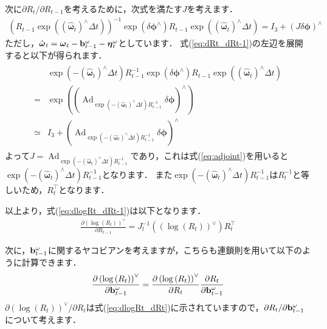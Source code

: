 次に$\partial R_{t} / \partial R_{t-1}$を考えるために，次式を満たす$J$を考えます．
%
\begin{align}
  \left( R_{t-1} \exp \left( \left( \hat{ \boldsymbol \omega }_{t} \right)^{\wedge} \Delta t \right) \right)^{-1} \exp \left( \delta \boldsymbol \phi^{\wedge} \right) R_{t-1} \exp \left( \left( \hat{ \boldsymbol \omega }_{t} \right)^{\wedge} \Delta t \right)
  =
  I_{3} + \left( J \delta \boldsymbol \phi \right)^{\wedge}
  \label{eq:dRt_dRt-1}
\end{align}
%
ただし，$\hat{ \boldsymbol \omega }_{t} = \boldsymbol \omega_{t} - {\bf b}_{t-1}^{\omega} - \boldsymbol \eta_{t}^{\omega}$としています．
式(\ref{eq:dRt_dRt-1})の左辺を展開すると以下が得られます．
%
\begin{align}
  \begin{split}
    & \exp \left( -\left( \hat{ \boldsymbol \omega }_{t} \right)^{\wedge} \Delta t \right) R_{t-1}^{-1} \exp \left( \delta \boldsymbol \phi^{\wedge} \right) R_{t-1} \exp \left( \left( \hat{ \boldsymbol \omega }_{t} \right)^{\wedge} \Delta t \right) \\
    = &
    \exp \left( \left( \operatorname{Ad}_{ \exp \left( -\left( \hat{ \boldsymbol \omega }_{t} \right)^{\wedge} \Delta t \right) R_{t-1}^{-1} } \delta \boldsymbol \phi \right)^{\wedge} \right) \\
    \simeq & I_{3} + \left( \operatorname{Ad}_{ \exp \left( -\left( \hat{ \boldsymbol \omega }_{t} \right)^{\wedge} \Delta t \right) R_{t-1}^{-1} } \delta \boldsymbol \phi \right)^{\wedge}
  \end{split}
\end{align}
%
よって$J = \operatorname{Ad}_{ \exp \left( -\left( \hat{ \boldsymbol \omega }_{t} \right)^{\wedge} \Delta t \right) R_{t-1}^{-1} }$であり，これは式(\ref{eq:adjoint})を用いると$\exp \left( -\left( \hat{ \boldsymbol{\omega} }_{t} \right)^{\wedge} \Delta t \right) R_{t-1}^{-1}$となります．
また$\exp \left( -\left( \hat{ \boldsymbol{\omega} }_{t} \right)^{\wedge} \Delta t \right) R_{t-1}^{-1}$は$R_{t}^{-1}$と等しいため，$R_{t}^{\top}$となります．

以上より，式(\ref{eq:dlogRt_dRt-1})は以下となります．
%
\begin{align}
  \frac{ \partial \left( \log \left( R_{t} \right) \right)^{\vee} }{ \partial R_{t-1} }
  =
  J_{l}^{-1} \left( \left( \log \left( R_{t} \right) \right)^{\vee} \right) R_{t}^{\top}
\end{align}
%

次に，${\bf b}_{t-1}^{\omega}$に関するヤコビアンを考えますが，こちらも連鎖則を用いて以下のように計算できます．
%
\begin{align}
  \frac{ \partial \left( \log \left( R_{t} \right) \right)^{\vee} }{ \partial {\bf b}_{t-1}^{\omega} }
  =
  \frac{ \partial \left( \log \left( R_{t} \right) \right)^{\vee} }{ \partial R_{t} }
  \frac{ \partial R_{t} }{ \partial {\bf b}_{t-1}^{\omega} }
  \label{eq:dlogRt_dbomegat-1}
\end{align}
%
$\partial \left( \log \left( R_{t} \right) \right)^{\vee} / \partial R_{t}$は式(\ref{eq:dlogRt_dRt})に示されていますので，$\partial R_{t} / \partial {\bf b}_{t-1}^{\omega}$について考えます．

